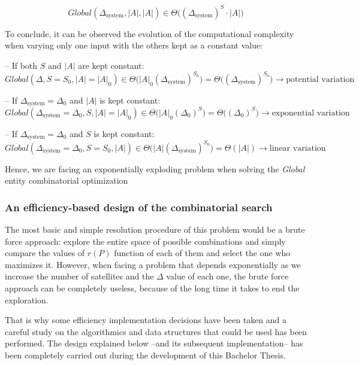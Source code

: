 \begin{equation}
\label{eq_LG_complexity}
Global(\Delta_{\text{system}},|A|,|A|) \in \Theta\big((\Delta_{\text{system}})^S \cdot  |A|\big)
\end{equation}

\indent To conclude, it can be observed the evolution of the computational complexity when varying only one input with the others kept as a constant value:

\noindent -- If both $S$ and $|A|$ are kept constant:
\[Global(\Delta,S=S_0,|A|=|A|_0) \in \Theta\big(|A|_0(\Delta_{\text{system}})^{S_0}\big)=\Theta\big((\Delta_{\text{system}})^{S_0}\big) \rightarrow \text{potential variation} \]

\noindent -- If $\Delta_{\text{system}}=\Delta_0$ and $|A|$ is kept constant:
\[Global(\Delta_{\text{system}}=\Delta_0,S,|A|=|A|_0) \in \Theta\big(|A|_0(\Delta_0)^S\big)=\Theta\big((\Delta_0)^S\big) \rightarrow \text{exponential variation}	\]

\noindent -- If $\Delta_{\text{system}}=\Delta_0$ and $S$ is kept constant:
\[Global(\Delta_{\text{system}}=\Delta_0,S=S_0,|A|) \in \Theta\big(|A|(\Delta_{\text{system}})^{S_0}\big)=\Theta(|A|) \rightarrow \text{linear variation}	\]

Hence, we are facing an exponentially exploding problem when solving the \emph{Global} entity combinatorial optimization

\subsubsection{An efficiency-based design of the combinatorial search}

The most basic and simple resolution procedure of this problem would be a brute force approach: explore the entire space of possible combinations and simply compare the values of $r(P)$ function of each of them and select the one who maximizes it. However, when facing a problem that depends exponentially as we increase the number of satellites and the $\Delta$ value of each one, the brute force approach can be completely useless, because of the long time it takes to end the exploration.

That is why some efficiency implementation decisions have been taken and a careful study on the algorithmics and data structures that could be used has been performed. The design explained below --and its subsequent implementation-- has been completely carried out during the development of this Bachelor Thesis.

